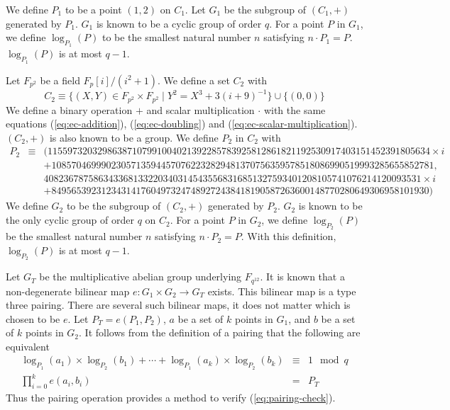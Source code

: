 \documentclass[9pt,oneside]{amsart}
\begin{document}
We define $P_1$ to be a point $(1,2)$ on $C_1$. Let $G_1$ be the subgroup of $(C_1,+)$ generated by $P_1$. $G_1$ is known to be a cyclic group of order $q$. For a point $P$ in $G_1$, we define $\log_{P_1}(P)$ to be the smallest natural number $n$ satisfying $n\cdot P_1=P$. $\log_{P_1}(P)$ is at most $q-1$.

Let $F_{p^2}$ be a field $F_{p}[i]/(i^2+1)$. We define a set $C_2$ with
\begin{equation}
C_2\equiv\{(X,Y)\in F_{p^2}\times F_{p^2}\mid Y^2=X^3+3(i+9)^{-1}\}\cup\{(0,0)\}
\end{equation}
We define a binary operation $+$ and scalar multiplication $\cdot$ with the same equations (\ref{eq:ec-addition}), (\ref{eq:ec-doubling}) and (\ref{eq:ec-scalar-multiplication}). $(C_2,+)$ is also known to be a group. We define $P_2$ in $C_2$ with
\begin{eqnarray}
P_2&\equiv&
(11559732032986387107991004021392285783925812861821192530917403151452391805634 \times i\\\nonumber &&+ 10857046999023057135944570762232829481370756359578518086990519993285655852781,\\\nonumber && 4082367875863433681332203403145435568316851327593401208105741076214120093531 \times i\\\nonumber &&+ 8495653923123431417604973247489272438418190587263600148770280649306958101930)
\end{eqnarray}
We define $G_2$ to be the subgroup of $(C_2,+)$ generated by $P_2$. $G_2$ is known to be the only cyclic group of order $q$ on $C_2$. For a point $P$ in $G_2$, we define $\log_{P_2}(P)$ be the smallest natural number $n$ satisfying $n\cdot P_2=P$. With this definition, $\log_{P_2}(P)$ is at most $q-1$.

Let $G_T$ be the multiplicative abelian group underlying $F_{q^{12}}$. It is known that a non-degenerate bilinear map $e : G_1\times G_2 \to G_T$ exists. This bilinear map is a type three pairing. There are several such bilinear maps, it does not matter which is chosen to be $e$.
Let $P_T = e(P_1, P_2)$, $a$ be a set of $k$ points in $G_1$, and $b$ be a set of $k$ points in $G_2$. It follows from the definition of a pairing that the following are equivalent
\begin{eqnarray} \label{eq:pairing-check}
\log_{P_1}(a_1)\times\log_{P_2}(b_1)+\cdots+\log_{P_1}(a_{k})\times\log_{P_2}(b_{k})&\equiv& 1\mod q\\
\prod_{i=0}^{k}e\left(a_i, b_i\right) &=& P_T
\end{eqnarray}
Thus the pairing operation provides a method to verify (\ref{eq:pairing-check}).
\end{document}
